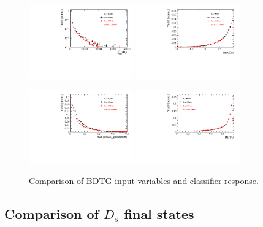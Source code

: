 \begin{figure}[h]
\includegraphics[height=!,width=0.4\textwidth]{figs/dataVsMC/run1vs2_norm/Ds2all_Ds_FDCHI2_ORIVX.pdf}
\includegraphics[height=!,width=0.4\textwidth]{figs/dataVsMC/run1vs2_norm/Ds2all_maxCos.pdf}

\includegraphics[height=!,width=0.4\textwidth]{figs/dataVsMC/run1vs2_norm/Ds2all_max_ghostProb.pdf}
\includegraphics[height=!,width=0.4\textwidth]{figs/dataVsMC/run1vs2_norm/Ds2all_BDTG_response.pdf}

\caption{Comparison of BDTG input variables and classifier response.}
\label{fig:}
\end{figure}



\clearpage
\subsection{Comparison of $D_s$ final states}

